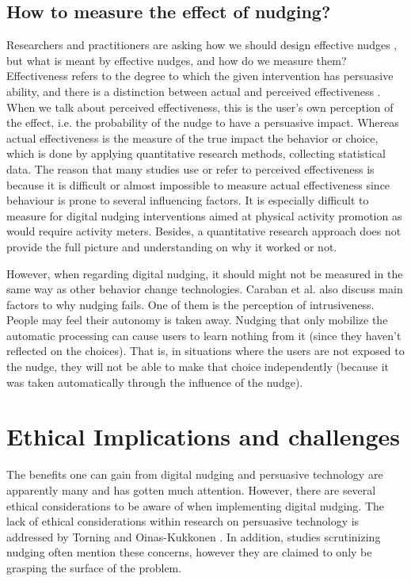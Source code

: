 \subsection{How to measure the effect of nudging?}
Researchers and practitioners are asking how we should design effective nudges 
\cite{purohit_functional_2019},
but what is meant by effective nudges, and how do we measure them? Effectiveness refers to the degree to which the given intervention has persuasive ability, and there is a distinction between actual and perceived effectiveness 
\cite{dillard_relationship_2007}.
When we talk about perceived effectiveness, this is the user's own perception of the effect, i.e. the probability of the nudge to have a persuasive impact. Whereas actual effectiveness is the measure of the true impact the behavior or choice, which is done by applying quantitative research methods, collecting statistical data. The reason that many studies use or refer to perceived effectiveness is because it is difficult or almost impossible to measure actual effectiveness since behaviour is prone to several influencing factors. It is especially difficult to measure for digital nudging interventions aimed at physical activity promotion as would require activity meters. Besides, a quantitative research approach does not provide the full picture and understanding on why it worked or not. 

However, when regarding digital nudging, it should might not be measured in the same way as other behavior change technologies. Caraban et al. also discuss main factors to why nudging fails. One of them is the perception of intrusiveness. People may feel their autonomy is taken away. Nudging that only mobilize the automatic processing can cause users to learn nothing from it (since they haven't reflected on the choices). That is, in situations where the users are not exposed to the nudge, they will not be able to make that choice independently (because it was taken automatically through the influence of the nudge). 

\section{Ethical Implications and challenges}
The benefits one can gain from digital nudging and persuasive technology are apparently many and has gotten much attention. However, there are several ethical considerations to be aware of when implementing digital nudging. The lack of ethical considerations within research on persuasive technology is addressed by Torning and Oinas-Kukkonen 
\cite{torning_pdf_2009}.
In addition, studies scrutinizing nudging often mention these concerns, however they are claimed to only be grasping the surface of the problem. 

